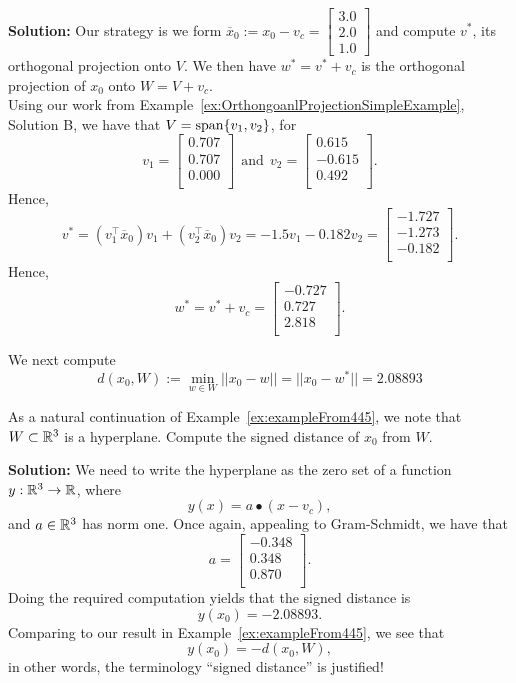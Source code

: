 \textbf{Solution:} Our strategy is we form $\overline{x}_0:=x_0 - v_c = \left[ \begin{array}{r} 3.0 \\ 2.0 \\ 1.0 \end{array} \right]$ and compute $v^\ast$, its orthogonal projection onto $V$. We then have $w^\ast = v^\ast + v_c$ is the orthogonal projection of $x_0$ onto $W=V+v_c$.\\

Using our work from Example~\ref{ex:OrthongoanlProjectionSimpleExample}, Solution B, we have that
$V=\mathrm{span} \{ v_1, v_2 \}$, for 
$$v_1=
\left[
\begin{array}{r}
0.707 \\
0.707 \\
0.000 \\
\end{array}
\right]
~~\text{and}~~v_2=
\left[
\begin{array}{r}
0.615 \\
-0.615 \\
0.492 \\
\end{array}
\right].
 $$
 Hence, 
 $$v^\ast = \left(v_1^\top \overline{x}_0 \right) v_1 + \left( v_2^\top \overline{x}_0 \right) v_2  = -1.5 v_1 -0.182 v_2 = \left[
\begin{array}{r}
-1.727 \\
-1.273 \\
-0.182 \\
\end{array}
\right].  $$
Hence, 
$$w^\ast = v^\ast + v_c = \left[
\begin{array}{r}
-0.727 \\
0.727 \\
2.818 \\
\end{array}
\right].
 $$

We next compute 
$$d(x_0,W):=\min\limits_{w \in W} ||x_0 - w || = ||x_0 - w^\ast|| = 2.08893$$

\Qed
\vspace*{0.2cm}

\begin{example}
\label{ex:exampleFrom445B} As a natural continuation of Example~\ref{ex:exampleFrom445}, we note that $W\subset \mathbb R^3$ is a hyperplane. Compute the signed distance of $x_0$ from $W$. 
\end{example}

\textbf{Solution:} We need to write the hyperplane as the zero set of a function $y:\mathbb R^3 \to \mathbb R$, where
$$y(x)=a \bullet(x-v_c), $$
and $a\in \mathbb R^3$ has norm one. Once again, appealing to Gram-Schmidt, we have that
$$ a=
\left[
\begin{array}{r}
-0.348 \\
0.348 \\
0.870 \\
\end{array}
\right].
$$
Doing the required computation yields that the signed distance is 
$$y(x_0)  = -2.08893.$$
Comparing to our result in Example~\ref{ex:exampleFrom445}, we see that
$$y(x_0)=-d(x_0, W), $$
in other words, the terminology ``signed distance'' is justified!
\Qed 


  
